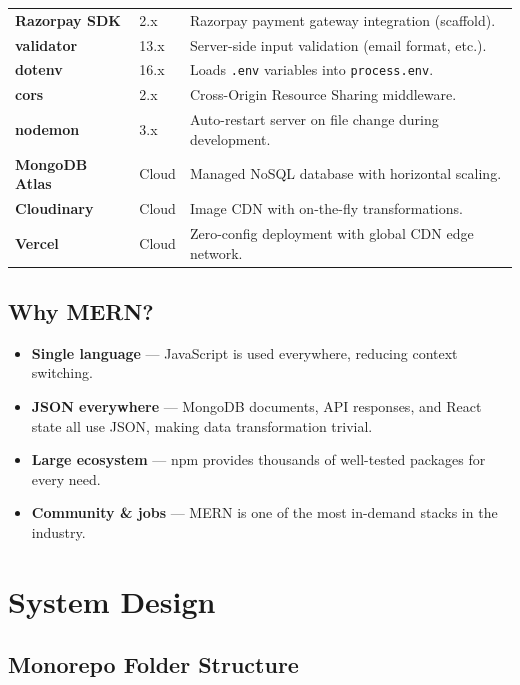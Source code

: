 \documentclass[12pt,a4paper]{report}
\begin{document}
\begin{table}[H]
\begin{tabular}{>{\bfseries}p{3.2cm} p{3cm} p{7cm}}
    Razorpay SDK & 2.x & Razorpay payment gateway integration (scaffold). \\
    validator & 13.x & Server-side input validation (email format, etc.). \\
    dotenv & 16.x & Loads \texttt{.env} variables into \texttt{process.env}. \\
    cors & 2.x & Cross-Origin Resource Sharing middleware. \\
    nodemon & 3.x & Auto-restart server on file change during development. \\
    \midrule
    MongoDB Atlas & Cloud & Managed NoSQL database with horizontal scaling. \\
    Cloudinary & Cloud & Image CDN with on-the-fly transformations. \\
    Vercel & Cloud & Zero-config deployment with global CDN edge network. \\
    \bottomrule
  \end{tabular}
\end{table}

\section{Why MERN?}

\begin{itemize}[leftmargin=*, label=\textbullet]
  \item \textbf{Single language} — JavaScript is used everywhere, reducing context switching.
  \item \textbf{JSON everywhere} — MongoDB documents, API responses, and React state all use JSON,
        making data transformation trivial.
  \item \textbf{Large ecosystem} — npm provides thousands of well-tested packages for every need.
  \item \textbf{Community \& jobs} — MERN is one of the most in-demand stacks in the industry.
\end{itemize}

\chapter{System Design}

\section{Monorepo Folder Structure}
\end{document}
